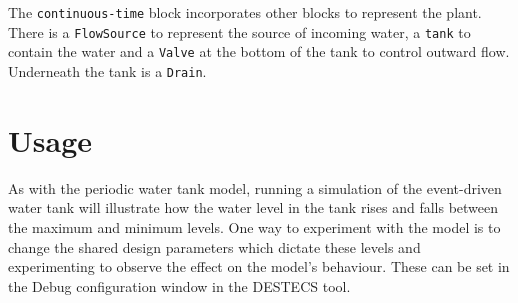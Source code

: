 The \texttt{continuous-time} block incorporates other blocks to
represent the plant.  There is a \texttt{FlowSource} to represent the
source of incoming water, a \texttt{tank} to contain the water and a
\texttt{Valve} at the bottom of the tank to control outward flow.
Underneath the tank is a \texttt{Drain}.

\section{Usage}
As with the periodic water tank model, running a simulation of the
event-driven water tank will illustrate how the water level in the
tank rises and falls between the maximum and minimum levels.  One way
to experiment with the model is to change the shared design parameters
which dictate these levels and experimenting to observe the effect on
the model's behaviour.  These can be set in the Debug configuration
window in the DESTECS tool.

